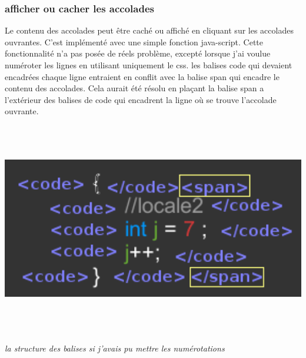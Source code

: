 \subsubsection*{afficher ou cacher les accolades}
Le contenu des accolades peut être caché ou affiché en cliquant sur les accolades ouvrantes. \newline
C'est implémenté avec une simple fonction java-script. \newline
Cette fonctionnalité n'a pas posée de réels problème, excepté lorsque j'ai voulue numéroter les lignes en utilisant uniquement le css. les balises code qui devaient encadrées chaque ligne entraient en conflit avec la balise span qui encadre le contenu des accolades. Cela aurait été résolu en plaçant la balise span a l'extérieur des balises de code qui encadrent la ligne où se trouve l'accolade ouvrante.
\includegraphics[height=10cm]{site/numerote.png} 
\textit{la structure des balises si j'avais pu mettre les numérotations}